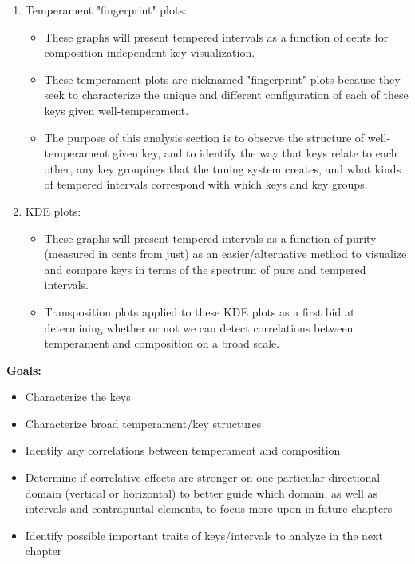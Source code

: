 \begin{enumerate}
\def\labelenumi{\arabic{enumi}.}
\tightlist
\item
  Temperament "fingerprint" plots:

  \begin{itemize}
  \tightlist
  \item
    These graphs will present tempered intervals as a function of cents
    for composition-independent key visualization.
  \item
    These temperament plots are nicknamed "fingerprint" plots because
    they seek to characterize the unique and different configuration of
    each of these keys given well-temperament.
  \item
    The purpose of this analysis section is to observe the structure of
    well-temperament given key, and to identify the way that keys relate
    to each other, any key groupings that the tuning system creates, and
    what kinds of tempered intervals correspond with which keys and key
    groups.
  \end{itemize}
\item
  KDE plots:

  \begin{itemize}
  \tightlist
  \item
    These graphs will present tempered intervals as a function of purity
    (measured in cents from just) as an easier/alternative method to
    visualize and compare keys in terms of the spectrum of pure and
    tempered intervals.
  \item
    Transposition plots applied to these KDE plots as a first bid at
    determining whether or not we can detect correlations between
    temperament and composition on a broad scale.
  \end{itemize}
\end{enumerate}

\textbf{Goals:}

\begin{itemize}
\tightlist
\item
  Characterize the keys
\item
  Characterize broad temperament/key structures
\item
  Identify any correlations between temperament and composition
\item
  Determine if correlative effects are stronger on one particular
  directional domain (vertical or horizontal) to better guide which
  domain, as well as intervals and contrapuntal elements, to focus more
  upon in future chapters
\item
  Identify possible important traits of keys/intervals to analyze in the
  next chapter
\end{itemize}

